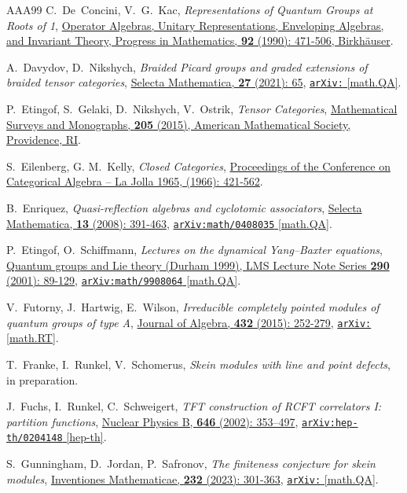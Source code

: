 \documentclass[12pt,dvipsnames]{article}
\numberwithin{equation}{section}
\theoremstyle{definition}
\newcommand{\1}{\ensuremath{\mathbbm{1}}}
\newcommand\arxiv[2]{\href{https://arXiv.org/abs/#1}{\texttt{arXiv:\allowbreak #1} #2}}
\newcommand\doi[2]{\href{https://doi.org/#1}{#2}}
\begin{document}
\begin{thebibliography}{AAA99}
C.~De~Concini, V.~G.~Kac,
\textit{Representations of Quantum Groups at Roots of 1},
\href{https://math.mit.edu/~kac/not-easily-available/representations.pdf}{Operator Algebras, Unitary Representations, Enveloping Algebras, and Invariant Theory,
Progress in Mathematics, \textbf{92} (1990): 471-506, Birkh\"auser}.

A.~Davydov, D.~Nikshych,
\textit{Braided Picard groups and graded extensions of braided tensor categories},
\doi{10.1007/s00029-021-00670-1}{Selecta Mathematica, \textbf{27} (2021): 65},
\arxiv{2006.08022}{[math.QA]}.
 
P.~Etingof, S.~Gelaki, D.~Nikshych, V.~Ostrik,
\textit{Tensor Categories},
\doi{10.1090/surv/205}{Mathematical Surveys and Monographs, \textbf{205} (2015), American Mathematical Society, Providence, RI}.

S.~Eilenberg, G. M.~Kelly,
\textit{Closed Categories},
\doi{10.1007/978-3-642-99902-4_22}{Proceedings of the Conference on Categorical Algebra -- La Jolla 1965, (1966): 421-562}.

B.~Enriquez,
\textit{Quasi-reflection algebras and cyclotomic associators},
\doi{10.1007/s00029-007-0048-2}{Selecta Mathematica, \textbf{13} (2008): 391-463},
\arxiv{math/0408035}{[math.QA]}.

P.~Etingof, O.~Schiffmann,
\textit{Lectures on the dynamical Yang--Baxter equations},
\doi{10.1017/CBO9780511542848.007}{Quantum groups and Lie theory (Durham 1999), LMS Lecture Note Series \textbf{290}
(2001): 89-129},
\arxiv{math/9908064}{[math.QA]}.

V.~Futorny, J.~Hartwig, E.~Wilson,
\textit{Irreducible completely pointed modules of quantum groups of type A},
\doi{10.1016/j.jalgebra.2015.03.006}{Journal of Algebra, \textbf{432} (2015): 252-279},
\arxiv{1404.0305}{[math.RT]}.

T.~Franke, I.~Runkel, V.~Schomerus, 
\textit{Skein modules with line and point defects}, in preparation.
 
J.~Fuchs, I.~Runkel, C.~Schweigert,
\textit{TFT construction of RCFT correlators I: partition functions},
\doi{10.1016/S0550-3213(02)00744-7}{Nuclear Physics B, \textbf{646} (2002): 353–497},
\arxiv{hep-th/0204148}{[hep-th]}.
 
S.~Gunningham, D.~Jordan, P.~Safronov,
\textit{The finiteness conjecture for skein modules},
\doi{10.1007/s00222-022-01167-0}{Inventiones Mathematicae, \textbf{232} (2023): 301-363},
\arxiv{1908.05233}{[math.QA]}.


\end{thebibliography}
\end{document}
